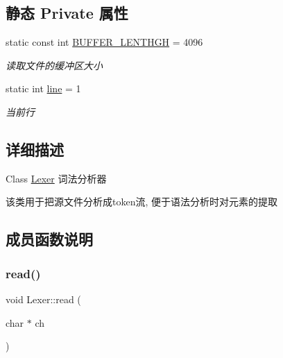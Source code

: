 \subsection*{静态 Private 属性}
\begin{DoxyCompactItemize}
\item 
\mbox{\label{class_lexer_af8222e02dc3180feb942b4a6d3083a22}} 
static const int \hyperlink{class_lexer_af8222e02dc3180feb942b4a6d3083a22}{B\+U\+F\+F\+E\+R\+\_\+\+L\+E\+N\+T\+H\+GH} = 4096
\begin{DoxyCompactList}\small\item\em 读取文件的缓冲区大小 \end{DoxyCompactList}\item 
\mbox{\label{class_lexer_a35d0802ee5cced4c5294fb6dc77ad2f4}} 
static int \hyperlink{class_lexer_a35d0802ee5cced4c5294fb6dc77ad2f4}{line} = 1
\begin{DoxyCompactList}\small\item\em 当前行 \end{DoxyCompactList}\end{DoxyCompactItemize}


\subsection{详细描述}
Class \hyperlink{class_lexer}{Lexer} 词法分析器 

该类用于把源文件分析成token流, 便于语法分析时对元素的提取 

\subsection{成员函数说明}
\mbox{\label{class_lexer_abb0f5b7f1e6fd685c8c8e9074553c67f}} 
\subsubsection{\texorpdfstring{read()}{read()}}
{\footnotesize\ttfamily void Lexer\+::read (\begin{DoxyParamCaption}\item[{char $\ast$}]{ch }\end{DoxyParamCaption})\hspace{0.3cm}{\ttfamily [private]}}


